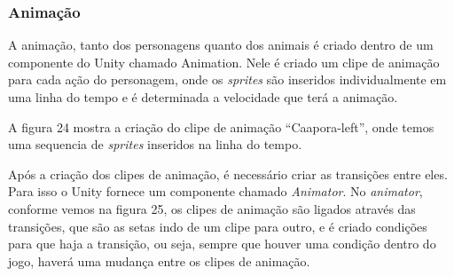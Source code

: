 \subsubsection{Animação}
A animação, tanto dos personagens quanto dos animais é criado dentro de um componente do Unity chamado Animation. Nele é criado um clipe de animação para cada ação do personagem, onde os \textit{sprites} são inseridos individualmente em uma linha do tempo e é determinada a velocidade que terá a animação.

A figura 24 mostra a criação do clipe de animação “Caapora-left”, onde temos uma sequencia de \textit{sprites} inseridos na linha do tempo.

\begin{figure}[h!]
		\centering
	\end{figure}

\pagebreak

Após a criação dos clipes de animação, é necessário criar as transições entre eles. Para isso o Unity fornece um componente chamado \textit{Animator}. No \textit{animator}, conforme vemos na figura 25, os clipes de animação são ligados através das transições, que são as setas indo de um clipe para outro, e é criado condições para que haja a transição, ou seja, sempre que houver uma condição dentro do jogo, haverá uma mudança entre os clipes de animação.
	
\pagebreak

\begin{figure}[h!]
		\centering
	\end{figure}


